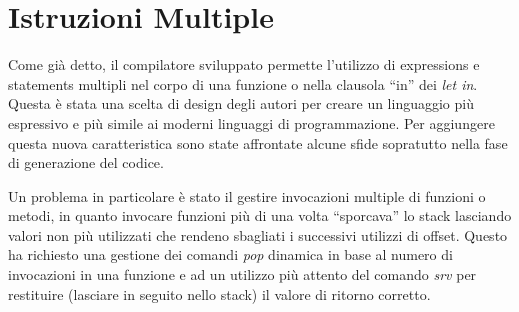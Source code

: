 \documentclass{scrreprt}
\begin{document}
\section{Istruzioni Multiple}
Come già detto, il compilatore sviluppato permette l'utilizzo di expressions e statements multipli nel corpo di una funzione o nella clausola ``in'' dei \textit{let in}. Questa è stata una 
scelta di design degli autori per creare un linguaggio più espressivo e più simile ai moderni linguaggi di programmazione. Per aggiungere questa nuova caratteristica sono state affrontate alcune sfide sopratutto 
nella fase di generazione del codice. 

Un problema in particolare è stato il gestire invocazioni multiple di funzioni o metodi, in quanto invocare funzioni più di una volta ``sporcava'' lo stack lasciando
valori non più utilizzati che rendeno sbagliati i successivi utilizzi di offset. Questo ha richiesto una gestione dei comandi \textit{pop} dinamica
in base al numero di invocazioni in una funzione e ad un utilizzo più attento del comando \textit{srv} per restituire (lasciare in seguito nello stack) il valore di ritorno corretto.  
\end{document}
